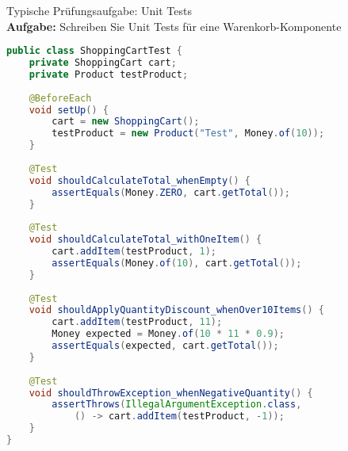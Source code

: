 \begin{example2}{Typische Prüfungsaufgabe: Unit Tests}\\
\textbf{Aufgabe:} Schreiben Sie Unit Tests für eine Warenkorb-Komponente

\begin{lstlisting}[language=Java, style=base]
public class ShoppingCartTest {
    private ShoppingCart cart;
    private Product testProduct;
    
    @BeforeEach
    void setUp() {
        cart = new ShoppingCart();
        testProduct = new Product("Test", Money.of(10));
    }
    
    @Test
    void shouldCalculateTotal_whenEmpty() {
        assertEquals(Money.ZERO, cart.getTotal());
    }
    
    @Test
    void shouldCalculateTotal_withOneItem() {
        cart.addItem(testProduct, 1);
        assertEquals(Money.of(10), cart.getTotal());
    }
    
    @Test 
    void shouldApplyQuantityDiscount_whenOver10Items() {
        cart.addItem(testProduct, 11);
        Money expected = Money.of(10 * 11 * 0.9);
        assertEquals(expected, cart.getTotal());
    }
    
    @Test
    void shouldThrowException_whenNegativeQuantity() {
        assertThrows(IllegalArgumentException.class, 
            () -> cart.addItem(testProduct, -1));
    }
}
\end{lstlisting}
\end{example2}


